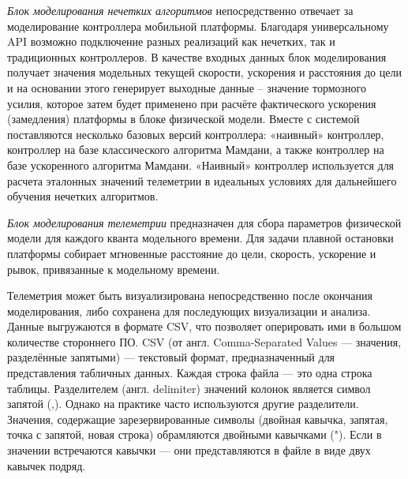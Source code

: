 \textit{Блок моделирования нечетких алгоритмов} непосредственно отвечает за моделирование контроллера мобильной платформы. Благодаря универсальному API возможно подключение разных реализаций как нечетких, так и традиционных контроллеров. В качестве входных данных блок моделирования получает значения модельных текущей скорости, ускорения и расстояния до цели и на основании этого генерирует выходные данные – значение тормозного усилия, которое затем будет применено при расчёте фактического ускорения (замедления) платформы в блоке физической модели. Вместе с системой поставляются несколько базовых версий контроллера: «наивный» контроллер, контроллер на базе классического алгоритма Мамдани, а также контроллер на базе ускоренного алгоритма Мамдани. «Наивный» контроллер используется для расчета эталонных значений телеметрии в идеальных условиях для дальнейшего обучения нечетких алгоритмов.

\textit{Блок моделирования телеметрии }предназначен для сбора параметров физической модели для каждого кванта модельного времени. Для задачи плавной остановки платформы собирает мгновенные расстояние до цели, скорость, ускорение и рывок, привязанные к модельному времени.

Телеметрия может быть визуализирована непосредственно после окончания моделирования, либо сохранена для последующих визуализации и анализа. Данные выгружаются в формате CSV, что позволяет оперировать ими в большом количестве стороннего ПО. CSV (от англ. Comma-Separated Values — значения, разделённые запятыми) — текстовый формат, предназначенный для представления табличных данных. Каждая строка файла — это одна строка таблицы. Разделителем (англ. delimiter) значений колонок является символ запятой (,). Однако на практике часто используются другие разделители. Значения, содержащие зарезервированные символы (двойная кавычка, запятая, точка с запятой, новая строка) обрамляются двойными кавычками ("). Если в значении встречаются кавычки — они представляются в файле в виде двух кавычек подряд.
